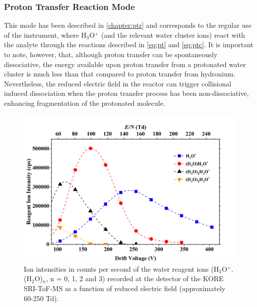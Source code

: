 \subsubsection{Proton Transfer Reaction Mode}
This mode has been described in \autoref{chapter:ptr} and corresponds to the regular use of the instrument, where H$_3$O$^+$ (and the relevant water cluster ions) react with the analyte through the reactions described in \autoref{eq:pt} and \autoref{eq:ptc}. 
It is important to note, however, that, although proton transfer can be spontaneously dissociative, the energy available upon proton transfer from a protonated water cluster is much less than that compared to proton transfer from hydronium.
Nevertheless, the reduced electric field in the reactor can trigger collisional induced dissociation when the proton transfer process has been non-dissociative, enhancing fragmentation of the protonated molecule.


\begin{figure}%
\centering
\includegraphics[height=0.35\textheight]{pics/nitros_paper_1.png}
\caption{Ion intensities in counts per second of the water reagent ions (H$_3$O$^+$.(H$_2$O)$_n$, n = 0, 1, 2 and 3) recorded at the detector of the KORE SRI-ToF-MS as a function of reduced electric field (approximately 60-250 Td).}
\label{fig:na_fig1}
\end{figure}

